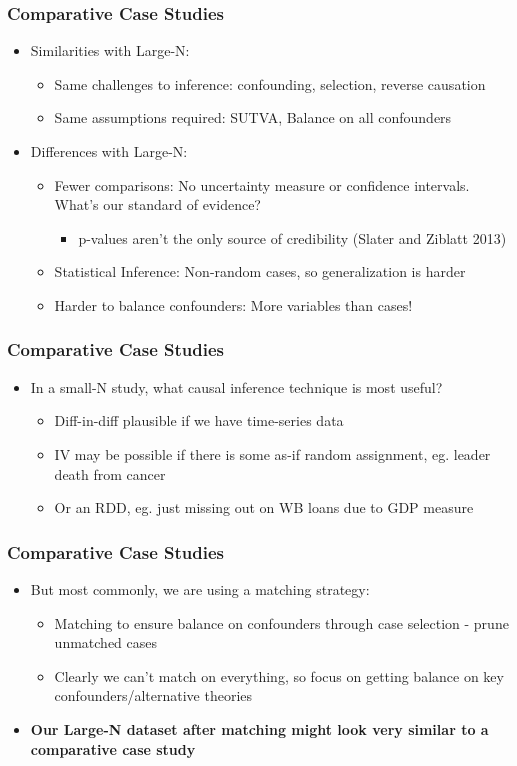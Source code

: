 \documentclass[xcolor=x11names,compress]{beamer}\usepackage[]{graphicx}\usepackage[]{color}
\renewcommand{\(}{\begin{columns}}
\renewcommand{\)}{\end{columns}}
\newcommand{\<}[1]{\begin{column}{#1}}
\renewcommand{\>}{\end{column}}
\begin{document}
\begin{frame}
\frametitle{Comparative Case Studies}
\begin{itemize}
\item Similarities with Large-N:
\pause
\begin{itemize}
\item Same challenges to inference: confounding, selection, reverse causation
\pause
\item Same assumptions required: SUTVA, Balance on all confounders
\pause
\end{itemize}
\item Differences with Large-N:
\begin{itemize}
\item Fewer comparisons: No uncertainty measure or confidence intervals. What's our standard of evidence?
\pause
\begin{itemize}
\item p-values aren't the only source of credibility (Slater and Ziblatt 2013)
\end{itemize}
\pause
\item Statistical Inference: Non-random cases, so generalization is harder
\pause
\item Harder to balance confounders: More variables than cases!
\end{itemize}
\end{itemize}
\end{frame}

\begin{frame}
\frametitle{Comparative Case Studies}
\begin{itemize}
\item In a small-N study, what causal inference technique is most useful?
\pause
\begin{itemize}
\item Diff-in-diff plausible if we have time-series data
\pause
\item IV may be possible if there is some as-if random assignment, eg. leader death from cancer
\pause
\item Or an RDD, eg. just missing out on WB loans due to GDP measure
\end{itemize}
\end{itemize}
\end{frame}

\begin{frame}
\frametitle{Comparative Case Studies}
\begin{itemize}
\item But most commonly, we are using a matching strategy:
\pause
\begin{itemize}
\item Matching to ensure balance on confounders through case selection - prune unmatched cases
\pause
\item Clearly we can't match on everything, so focus on getting balance on key confounders/alternative theories
\pause
\end{itemize}
\item \textbf{Our Large-N dataset after matching might look very similar to a comparative case study}
\end{itemize}
\end{frame}
\end{document}
